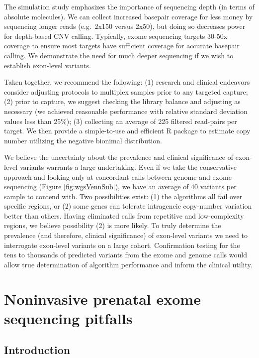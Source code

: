 \documentclass[11pt,letterpaper,oneside]{book}
\begin{document}
The simulation study emphasizes the importance of sequencing depth (in terms of absolute molecules).
We can collect increased basepair coverage for less money by sequencing longer reads (e.g.~2x150 versus 2x50), but doing so decreases power for depth-based CNV calling.
Typically, exome sequencing targets 30-50x coverage to ensure most targets have sufficient coverage for accurate basepair calling.
We demonstrate the need for much deeper sequencing if we wish to establish exon-level variants.

Taken together, we recommend the following:
(1) research and clinical endeavors consider adjusting protocols to multiplex samples prior to any targeted capture;
(2) prior to capture, we suggest checking the library balance and adjusting as necessary (we achieved reasonable performance with relative standard deviation values less than 25\%);
(3) collecting an average of 225 filtered read-pairs per target.
We then provide a simple-to-use and efficient R package to estimate copy number utilizing the negative bionimal distribution.

We believe the uncertainty about the prevalence and clinical significance of exon-level variants warrants a large undertaking.
Even if we take the conservative approach and looking only at concordant calls between genome and exome sequencing (Figure \ref{fig:wgsVennSub}), we have an average of 40 variants per sample to contend with.
Two possibilities exist: (1) the algorithms all fail over specific regions, or (2) some genes can tolerate intrageneic copy-number variation better than others.
Having eliminated calls from repetitive and low-complexity regions, we believe possibility (2) is more likely.
To truly determine the prevalence (and therefore, clinical significance) of exon-level variants we need to interrogate exon-level variants on a large cohort.
Confirmation testing for the tens to thousands of predicted variants from the exome and genome calls would allow true determination of algorithm performance and inform the clinical utility.

\hypertarget{cfES}{%
\chapter{Noninvasive prenatal exome sequencing pitfalls}\label{cfES}}

\hypertarget{introduction-1}{%
\section{Introduction}\label{introduction-1}}
\end{document}
